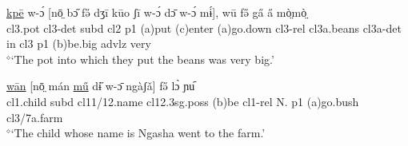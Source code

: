 \documentclass[10pt,twoside]{article}
\def\ci#1{{\ipaFont #1}}
\newcommand{\gl}[1]{`#1'}
\def\VSP{\vspace{0pt}}
\newcommand{\cl}[1]{{\sc cl#1}}
\def\elicited{$^\diamond$}
\newcommand{\comment}[1]{\textcolor{blue}{\emph{#1}}}
\begin{document}
\begin{exe}
	\ex \label{exThePotIntoWhich}	
		\gll \uline{kpē} w-ɔ́ [nō̤ bɔ̋ fə̋ dʒī kūo ʃī w-ɔ́ dɔ̄ w-ɔ́ mɨ́], wū fə̋ ga̋ a̋ mò̤mò̤	\\
		\cl3.pot \cl3-{\sc det} {\sc subd} \cl2  {\sc p1} ({\sc a})put ({\sc c})enter ({\sc a})go.down \cl3-{\sc rel} \cl3a.beans \cl3a-{\sc det} in \cl3  {\sc p1} ({\sc b})be.big {\sc advlz} very 	\\
		\glt \VSP \elicited \gl{The pot into which they put the beans was very big.}
\end{exe}%
%

\begin{exe} 
	\ex \label{exChildWhoseName}	

		\gll	\uline{wān} [nō̤ mán \uline{mű} dɨ̋ w-ɔ̄ ngàʃǎ] fə̋ lɔ̀ ɲu᷇				\\
			\cl1.child {\sc subd} \cl11/12.name \cl12.{\sc 3sg.poss} ({\sc b})be \cl1-{\sc rel} N. {\sc p1} ({\sc a})go.bush \cl3/7a.farm		\\
		\glt \VSP \elicited \gl{The child whose name is Ngasha went to the farm.}
	
\end{exe}%
%
%
%
%
\end{document}
